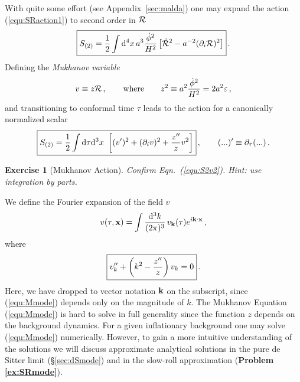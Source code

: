 \documentclass[12pt,letterpaper,rotate]{article}
\def\beq{\begin{equation}}
\def\eeq{\end{equation}}
\def\d{{\rm d}}
\def\R{{\cal R}}
\newtheorem{thm}{Exercise}
\begin{document}
{With quite some effort (see Appendix~\ref{sec:malda}) one may expand the action (\ref{equ:SRaction1}) to second order in $\R$
\beq
\label{equ:S(2)}
\fbox{$\displaystyle
S_{(2)} = \frac{1}{2} \int \d^4 x \, a^3 \frac{{\dot{\phi}}^2}{H^2} \left[ \dot \R^2 - a^{-2} (\partial_i \R)^2 \right]  $} \, .%
\eeq
 Defining the {\it Mukhanov variable}
\beq
v\equiv z \R \, , \qquad {\rm where} \qquad z^2 \equiv a^2 \frac{{\dot{\phi}}^2}{H^2}= 2a^2 \varepsilon\, ,
\eeq
and transitioning to conformal time $\tau$ leads to the action for a canonically normalized scalar
\beq
\label{equ:S2v2}
\fbox{$\displaystyle
S_{(2)} =\frac{1}{2} \int \d \tau \d^3 x \ \left[ (v')^2 + (\partial_i v)^2  + \frac{z''}{z} v^2\right] $}\, , \qquad (...)' \equiv \partial_\tau(...)\, .
\eeq
\begin{thm}[Mukhanov Action]
 Confirm Eqn.~(\ref{equ:S2v2}). Hint: use integration by parts.
 \end{thm}
We define the Fourier expansion
of the field $v$
\beq
v(\tau, {\bf x}) = \int \frac{\d^3 k}{(2\pi)^3} \, v_{\bf k}(\tau) e^{i {\bf k} \cdot {\bf x}}\, ,
\eeq
where
\beq
\label{equ:Mmode}
\fbox{$\displaystyle
v_k'' + \left( k^2 - \frac{z''}{z}\right) v_k = 0 $}\, .
\eeq
Here, we have dropped to vector notation ${\bf k}$ on the subscript, since (\ref{equ:Mmode}) depends only on the magnitude of $k$.
The Mukhanov Equation (\ref{equ:Mmode}) is hard to solve in full generality since the function $z$ depends on the background dynamics.
For a given inflationary background one may solve (\ref{equ:Mmode}) numerically.
However, to gain a more intuitive understanding of the solutions we will discuss 
approximate analytical solutions 
in the pure de Sitter limit (\S\ref{sec:dSmode}) and in
the slow-roll approximation ({\bf Problem \ref{ex:SRmode}}).




}
\end{document}
